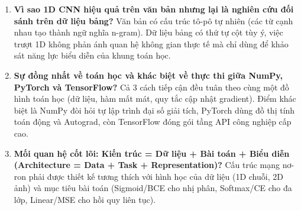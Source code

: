 \documentclass[12pt,a4paper]{report}
\begin{document}
\begin{enumerate}[label=\textbf{\arabic*.}]
    \item \textbf{Vì sao 1D CNN hiệu quả trên văn bản nhưng lại là nghiên cứu đối sánh trên dữ liệu bảng?}
    Văn bản có cấu trúc tô-pô tự nhiên (các từ cạnh nhau tạo thành ngữ nghĩa n-gram). Dữ liệu bảng có thứ tự cột tùy ý, việc trượt 1D không phản ánh quan hệ không gian thực tế mà chỉ dùng để khảo sát năng lực biểu diễn của khung toán học.
    
    \item \textbf{Sự đồng nhất về toán học và khác biệt về thực thi giữa NumPy, PyTorch và TensorFlow?}
    Cả 3 cách tiếp cận đều tuân theo cùng một đồ hình toán học (dữ liệu, hàm mất mát, quy tắc cập nhật gradient). Điểm khác biệt là NumPy đòi hỏi tự lập trình đại số giải tích, PyTorch dùng đồ thị tính toán động và Autograd, còn TensorFlow đóng gói tầng API công nghiệp cấp cao.
    
    \item \textbf{Mối quan hệ cốt lõi: Kiến trúc = Dữ liệu + Bài toán + Biểu diễn (Architecture = Data + Task + Representation)?}
    Cấu trúc mạng nơ-ron phải được thiết kế tương thích với hình học của dữ liệu (1D chuỗi, 2D ảnh) và mục tiêu bài toán (Sigmoid/BCE cho nhị phân, Softmax/CE cho đa lớp, Linear/MSE cho hồi quy liên tục).
\end{enumerate}
\end{document}
